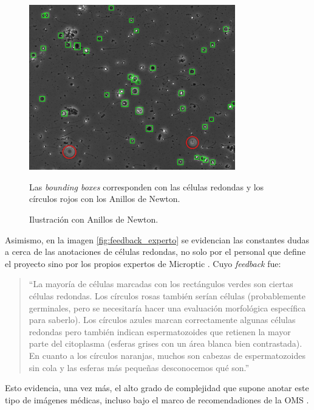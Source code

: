 \documentclass[12pt,a4paper,onecolumn,oneside]{report}
\begin{document}
\begin{figure}[H]
  \centering
  \includegraphics[width=0.8\textwidth]{figuras/rounds_cells/Anillos de Newton.png}
  \caption{Ilustración con Anillos de Newton.}
  \label{fig:Anillos_Newton}
  Las \textit{bounding boxes} corresponden con las células redondas y los círculos rojos con los Anillos de Newton.
\end{figure}

Asimismo, en la imagen \ref{fig:feedback_experto} se evidencian las constantes dudas a cerca de las anotaciones de células redondas, no solo por el personal que define el proyecto sino por los propios expertos de Microptic \cite{microptic}. 
Cuyo \textit{feedback} fue:

\begin{quote}
“La mayoría de células marcadas con los rectángulos verdes son ciertas células redondas. Los círculos rosas también serían células (probablemente germinales, pero se necesitaría hacer una evaluación morfológica específica para saberlo). Los círculos azules marcan correctamente algunas células redondas pero también indican espermatozoides que retienen la mayor parte del citoplasma (esferas grises con un área blanca bien contrastada). En cuanto a los círculos naranjas, muchos son cabezas de espermatozoides sin cola y las esferas más pequeñas desconocemos qué son.”
\end{quote}

Esto evidencia, una vez más, el alto grado de complejidad que supone anotar este tipo de imágenes médicas, incluso bajo el marco de recomendadiones de la OMS \cite{OMS} \cite{BJBS}.
\end{document}

